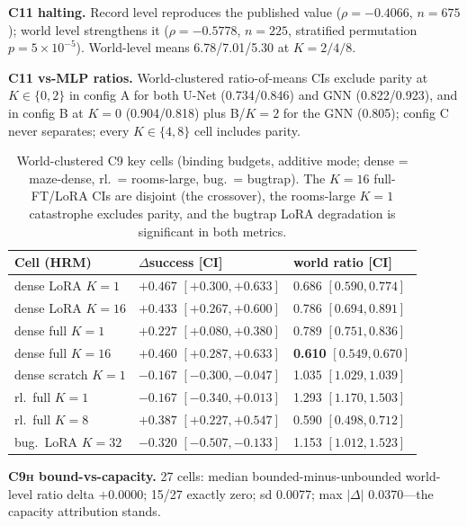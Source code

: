 \documentclass[letterpaper]{article} %
\newcommand{\stage}[1]{\textsc{#1}}
\begin{document}
\textbf{\stage{C11} halting.} Record level reproduces the published value ($\rho{=}-0.4066$, $n{=}675$); world level strengthens it ($\rho{=}-0.5778$, $n{=}225$, stratified permutation $p{=}5{\times}10^{-5}$). World-level means 6.78/7.01/5.30 at $K{=}2/4/8$.

\textbf{\stage{C11} vs-MLP ratios.} World-clustered ratio-of-means CIs exclude parity at $K\in\{0,2\}$ in config A for both U-Net (0.734/0.846) and GNN (0.822/0.923), and in config B at $K{=}0$ (0.904/0.818) plus B/$K{=}2$ for the GNN (0.805); config C never separates; every $K\in\{4,8\}$ cell includes parity.

\begin{table}[h]
\centering
\scriptsize
\setlength{\tabcolsep}{2.5pt}
\begin{tabular}{@{}lll@{}}
\toprule
Cell (HRM) & $\Delta$success [CI] & world ratio [CI] \\
\midrule
dense LoRA $K{=}1$ & $+0.467$ $[+0.300,+0.633]$ & 0.686 $[0.590,0.774]$ \\
dense LoRA $K{=}16$ & $+0.433$ $[+0.267,+0.600]$ & 0.786 $[0.694,0.891]$ \\
dense full $K{=}1$ & $+0.227$ $[+0.080,+0.380]$ & 0.789 $[0.751,0.836]$ \\
dense full $K{=}16$ & $+0.460$ $[+0.287,+0.633]$ & \textbf{0.610} $[0.549,0.670]$ \\
dense scratch $K{=}1$ & $-0.167$ $[-0.300,-0.047]$ & 1.035 $[1.029,1.039]$ \\
rl.\ full $K{=}1$ & $-0.167$ $[-0.340,+0.013]$ & 1.293 $[1.170,1.503]$ \\
rl.\ full $K{=}8$ & $+0.387$ $[+0.227,+0.547]$ & 0.590 $[0.498,0.712]$ \\
bug.\ LoRA $K{=}32$ & $-0.320$ $[-0.507,-0.133]$ & 1.153 $[1.012,1.523]$ \\
\bottomrule
\end{tabular}
\caption{World-clustered \stage{C9} key cells (binding budgets, additive mode; dense = maze-dense, rl.\ = rooms-large, bug.\ = bugtrap). The $K{=}16$ full-FT/LoRA CIs are disjoint (the crossover), the rooms-large $K{=}1$ catastrophe excludes parity, and the bugtrap LoRA degradation is significant in both metrics.}
\label{tab:wcr-c9}
\end{table}

\textbf{\stage{C9h} bound-vs-capacity.} 27 cells: median bounded-minus-unbounded world-level ratio delta $+0.0000$; 15/27 exactly zero; sd 0.0077; max $|\Delta|$ 0.0370---the capacity attribution stands.
\end{document}
